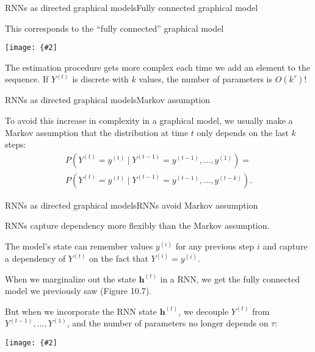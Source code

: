 \documentclass{beamer}
\renewcommand{\vec}[1]{\boldsymbol{#1}}
\newcommand{\myfig}[3]{\centerline{\texttt{[image: \{\#2]}}}
    \centerline{\scriptsize #3}}
\begin{document}
\begin{frame}{RNNs as directed graphical models}{Fully connected graphical model}

  This corresponds to the ``fully connected'' graphical model

  \medskip
  
  \myfig{3in}{goodfellow-fig10-07}{Goodfellow, Bengio, and Courville (2016), Fig.\ 10.7}

  \medskip

  The estimation procedure gets \alert{more complex} each time we add
  an element to the sequence. If $Y^{(t)}$ is discrete with $k$ values,
  the number of parameters is $O(k^\tau)$!

\end{frame}


\begin{frame}{RNNs as directed graphical models}{Markov assumption}

  To avoid this increase in complexity in a graphical model, we
  usually make a \alert{Markov assumption} that the distribution at
  time $t$ only depends on the last $k$ steps:
  \begin{eqnarray}
  P(Y^{(t)}=y^{(t)} \mid Y^{(t-1)}=y^{(t-1)},\ldots,y^{(1)}) = \nonumber \\
  P(Y^{(t)}=y^{(t)} \mid Y^{(t-1)}=y^{(t-1)},\ldots,y^{(t-k)}). \nonumber
  \end{eqnarray}

\end{frame}


\begin{frame}{RNNs as directed graphical models}{RNNs avoid Markov assumption}

  RNNs capture dependency more flexibly than the Markov
  assumption.

  \medskip

  The model's state can remember values $y^{(i)}$ for \alert{any}
  previous step $i$ and capture a dependency of $Y^{(t)}$ on the
  fact that $Y^{(i)}=y^{(i)}$.

  \medskip

  When we marginalize out the state $\vec{h}^{(t)}$ in a RNN, we get
  the fully connected model we previously saw (Figure 10.7).

  \medskip

  But when we incorporate the RNN state $\vec{h}^{(t)}$, we \alert{decouple}
  $Y^{(t)}$ from $Y^{(t-1)},\ldots,Y^{(1)}$, and the number of parameters
  \alert{no longer depends on $\tau$}:

  \medskip
  
  
  \myfig{3in}{goodfellow-fig10-08}{Goodfellow, Bengio, and Courville (2016), Fig.\ 10.8}
  
\end{frame}
\end{document}
